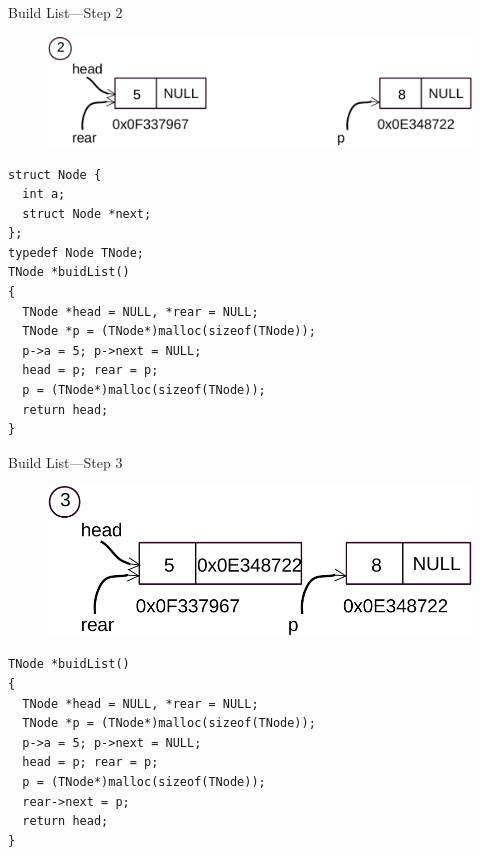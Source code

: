 \begin{frame}[fragile]{Build List---Step 2}
\vspace{-0.1in}
\begin{figure}
\begin{center}
	\includegraphics[width=0.55\linewidth]{figs/list_build_step2.pdf}
\end{center}
\end{figure}
\begin{lstlisting}[xleftmargin=0.05\linewidth, linewidth=0.9\linewidth]
struct Node {
  int a;
  struct Node *next;
};
typedef Node TNode;
TNode *buidList()
{
  TNode *head = NULL, *rear = NULL;
  TNode *p = (TNode*)malloc(sizeof(TNode));
  p->a = 5; p->next = NULL;
  head = p; rear = p;
  p = (TNode*)malloc(sizeof(TNode));
  return head;
}
\end{lstlisting}
\end{frame}

\begin{frame}[fragile]{Build List---Step 3}
\vspace{-0.1in}
\begin{figure}
\begin{center}
	\includegraphics[width=0.5\linewidth]{figs/list_build_step3.pdf}
\end{center}
\end{figure}
\begin{lstlisting}[xleftmargin=0.05\linewidth, linewidth=0.9\linewidth]
TNode *buidList()
{
  TNode *head = NULL, *rear = NULL;
  TNode *p = (TNode*)malloc(sizeof(TNode));
  p->a = 5; p->next = NULL;
  head = p; rear = p;
  p = (TNode*)malloc(sizeof(TNode));
  rear->next = p;
  return head;
}
\end{lstlisting}
\end{frame}

